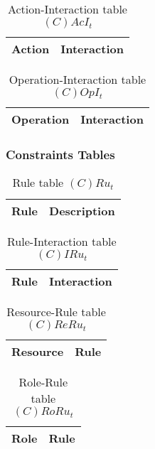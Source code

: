 \begin{table}[H]
	\centering
	\begin{tabular}{|p{4cm}|p{8cm}|}
			\hline
			\textbf{Action} & \textbf{Interaction} \\
			\hline
		\end{tabular}
	\caption{Action-Interaction table $(C)AcI_t$}
	\label{tab:cacit}
\end{table}

\begin{table}[H]
	\centering
	\begin{tabular}{|p{4cm}|p{8cm}|}
			\hline
			\textbf{Operation} & \textbf{Interaction} \\
			\hline
		\end{tabular}
	\caption{Operation-Interaction table $(C)OpI_t$}
	\label{tab:opit}
\end{table}

\subsubsection*{Constraints Tables}

\begin{table}[H]
	\centering
	\begin{tabular}{|p{4cm}|p{8cm}|}
			\hline
			\textbf{Rule} & \textbf{Description} \\
			\hline
		\end{tabular}
	\caption{Rule table $(C)Ru_t$}
	\label{tab:crut}
\end{table}

\begin{table}[H]
	\centering
	\begin{tabular}{|p{4cm}|p{8cm}|}
			\hline
			\textbf{Rule} & \textbf{Interaction} \\
			\hline
		\end{tabular}
	\caption{Rule-Interaction table $(C)IRu_t$}
	\label{tab:cirut}
\end{table}

\begin{table}[H]
	\centering
	\begin{tabular}{|p{4cm}|p{8cm}|}
			\hline
			\textbf{Resource} & \textbf{Rule} \\
			\hline
		\end{tabular}
	\caption{Resource-Rule table $(C)ReRu_t$}
	\label{tab:crerut}
\end{table}

\begin{table}[H]
	\centering
	\begin{tabular}{|p{4cm}|p{8cm}|}
			\hline
			\textbf{Role} & \textbf{Rule} \\
			\hline
		\end{tabular}
	\caption{Role-Rule table $(C)RoRu_t$}
	\label{tab:crorut}
\end{table}

